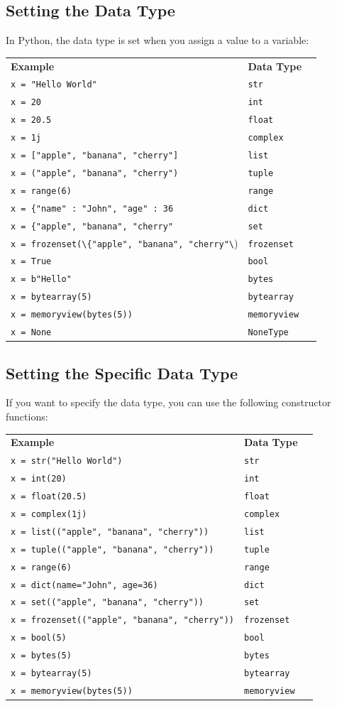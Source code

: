 \documentclass[12pt,a4paper]{article}
\newcommand{\lcode}[1]{%
	\lstinline{#1}%
}
\newcommand{\tcol}[2]{%
	\quad #1 & #2 \\
}
\begin{document}
\subsection{Setting the Data Type}

In Python, the data type is set when you assign a value to a variable:

\begin{table}[h]
	\begin{center}
		\begin{tabularx}{.85\textwidth}{Xll}
\textbf{Example} & \textbf{Data Type} \\
	\tcol{\lcode{x = "Hello World"} }{\lcode{str}}
	\tcol{\lcode{x = 20}}{\lcode{int}}
	\tcol{\lcode{x = 20.5}}{\lcode{float}}
	\tcol{\lcode{x = 1j}}{\lcode{complex}}
	\tcol{\lcode{x = ["apple", "banana", "cherry"]}}{\lcode{list}}
	\tcol{\lcode{x = ("apple", "banana", "cherry")}}{\lcode{tuple}}
	\tcol{\lcode{x = range(6)} }{\lcode{range}}
	\tcol{\lcode{x = {"name" : "John", "age" : 36}} }{\lcode{dict}}
	\tcol{\lcode{x = {"apple", "banana", "cherry"}} }{\lcode{set}}
	\tcol{\lcode{x = frozenset(\{"apple", "banana", "cherry"\})}}{\lcode{frozenset}}
	\tcol{\lcode{x = True}}{\lcode{bool}}
	\tcol{\lcode{x = b"Hello"} }{\lcode{bytes}}
	\tcol{\lcode{x = bytearray(5)} }{\lcode{bytearray}}
	\tcol{\lcode{x = memoryview(bytes(5))} }{\lcode{memoryview}}
	\tcol{\lcode{x = None}}{\lcode{NoneType}}
		\end{tabularx}
	\end{center}
\end{table}
\subsection{Setting the Specific Data Type}

If you want to specify the data type, you can use the following constructor
functions:

\begin{table}[h]
	\begin{center}
		\begin{tabularx}{.85\textwidth}{Xll}
\textbf{Example} & \textbf{Data Type} \\
	\tcol{\lcode{x = str("Hello World")}}{\lcode{str}}
	\tcol{\lcode{x = int(20)}}{\lcode{int}}
	\tcol{\lcode{x = float(20.5)}}{\lcode{float}}
	\tcol{\lcode{x = complex(1j)}}{\lcode{complex}}
	\tcol{\lcode{x = list(("apple", "banana", "cherry"))}}{\lcode{list}}
	\tcol{\lcode{x = tuple(("apple", "banana", "cherry"))}}{\lcode{tuple}}
	\tcol{\lcode{x = range(6)}}{\lcode{range}}
	\tcol{\lcode{x = dict(name="John", age=36)}}{\lcode{dict}}
	\tcol{\lcode{x = set(("apple", "banana", "cherry"))}}{\lcode{set}}
	\tcol{\lcode{x = frozenset(("apple", "banana", "cherry"))}}{\lcode{frozenset}}
	\tcol{\lcode{x = bool(5)}}{\lcode{bool}}
	\tcol{\lcode{x = bytes(5)}}{\lcode{bytes}}
	\tcol{\lcode{x = bytearray(5)}}{\lcode{bytearray}}
	\tcol{\lcode{x = memoryview(bytes(5))}}{\lcode{memoryview}}
		\end{tabularx}
	\end{center}
\end{table}
\end{document}
